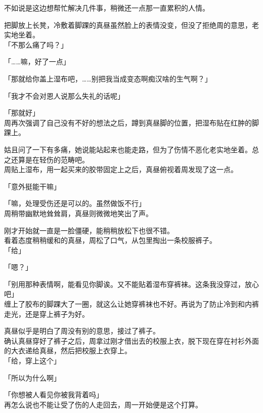 不如说是这边想帮忙解决几件事，稍微还一点那一直累积的人情。

把脚放上长凳，冷敷着脚踝的真昼虽然脸上的表情没变，但没了拒绝周的意思，老实地坐着。\\

「不那么痛了吗？」

「……嘛，好了一点」

「那就给你盖上湿布吧，……别把我当成变态啊痴汉啥的生气啊？」

「我才不会对恩人说那么失礼的话呢」

「那就好」\\

周再次强调了自己没有不好的想法之后，蹲到真昼脚的位置，把湿布贴在红肿的脚踝上。

姑且问了一下有多痛，她说能站起来也能走路，但为了伤情不恶化老实地坐着。总之还算是在轻伤的范畴吧。\\

周贴上湿布，用一起买来的胶带固定上之后，真昼俯视着周发现了这一点。

「意外挺能干嘛」

「嘛，处理受伤还是可以的。虽然做饭不行」\\

周稍带幽默地耸耸肩，真昼则微微地笑出了声。

刚才开始就一直是一脸僵硬，能稍稍放松下也很不错。\\

看着态度稍稍缓和的真昼，周松了口气，从包里掏出一条校服裤子。\\

「给」

「嗯？」

「别用那种表情啊，能看见你脚诶。又不能贴着湿布穿裤袜。这条我没穿过，放心吧」\\

缠上了胶布的脚踝大了一圈，就这么让她穿裤袜也不好。再说为了防止冷到和内裤走光，还是穿上裤子为好。

真昼似乎是明白了周没有别的意思，接过了裤子。\\

确认真昼穿好了裤子之后，周拿过刚才借出去的校服上衣，脱下现在穿在衬衫外面的大衣递给真昼，然后把校服上衣穿上。\\

「给，穿上这个」

「所以为什么啊」

「你想被人看见你被我背着吗」\\

再怎么说也不能让受了伤的人走回去，周一开始便是这个打算。

